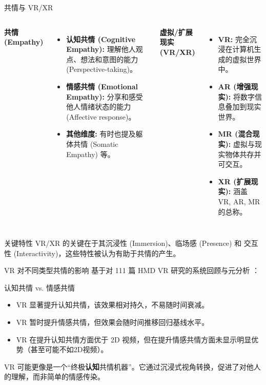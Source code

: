 \documentclass[aspectratio=169,xcolor=dvipsnames]{beamer}
\begin{document}
\begin{frame}{共情与 VR/XR}
    \begin{columns}[c]
            \textbf{共情 (Empathy)}
            \begin{itemize}
                \item \textbf{认知共情 (Cognitive Empathy):} 理解他人观点、想法和意图的能力 (Perspective-taking)。
                \item \textbf{情感共情 (Emotional Empathy):} 分享和感受他人情绪状态的能力 (Affective response)。
                \item \textbf{其他维度:} 有时也提及躯体共情 (Somatic Empathy) 等。
            \end{itemize}

            \textbf{虚拟/扩展现实 (VR/XR)}
             \begin{itemize}
                \item \textbf{VR:} 完全沉浸在计算机生成的虚拟世界中。
                \item \textbf{AR (增强现实):} 将数字信息叠加到现实世界。
                \item \textbf{MR (混合现实):} 虚拟与现实物体共存并可交互。
                \item \textbf{XR (扩展现实):} 涵盖 VR, AR, MR 的总称。
            \end{itemize}
    \end{columns}
     \begin{alertblock}{关键特性}
        VR/XR 的关键在于其\alert{沉浸性 (Immersion)}、\alert{临场感 (Presence)} 和 \alert{交互性 (Interactivity)}，这些特性被认为有助于共情的产生。
    \end{alertblock}
\end{frame}

\begin{frame}{VR 对不同类型共情的影响}
    基于对 111 篇 HMD VR 研究的系统回顾与元分析 \cite{lee2024measurement}：
    \begin{block}{认知共情 vs. 情感共情}
        \begin{itemize}
            \item VR \alert{显著提升认知共情}，该效果相对\alert{持久}，不易随时间衰减。
            \item VR \alert{暂时提升情感共情}，但效果会随时间推移\alert{回归基线水平}。
            \item VR 在提升认知共情方面\alert{优于 2D 视频}，但在提升情感共情方面未显示明显优势（甚至可能不如2D视频）。
        \end{itemize}
    \end{block}
    \begin{theorem}
       VR 可能更像是一个“终极\textbf{认知}共情机器”。它通过沉浸式视角转换，促进了对他人的理解，而非简单的情感传染。
    \end{theorem}
\end{frame}
\end{document}
